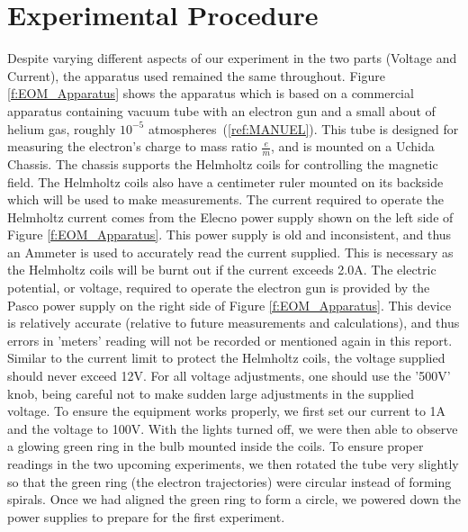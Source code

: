 \documentclass[12pt]{article}
\begin{document}
\section{Experimental Procedure}
Despite varying different aspects of our experiment in the two parts (Voltage and Current), the apparatus used remained the same throughout. Figure \ref{f:EOM_Apparatus} shows the apparatus which is based on a commercial apparatus containing vacuum tube with an electron gun and a small about of helium gas, roughly $10^{-5}$ atmospheres~(\ref{ref:MANUEL}). This tube is designed for measuring the electron's charge to mass ratio $\frac{e}{m}$, and is mounted on a Uchida Chassis. The chassis supports the Helmholtz coils for controlling the magnetic field. The Helmholtz coils also have a centimeter ruler mounted on its backside which will be used to make measurements. The current required to operate the Helmholtz current comes from the Elecno power supply shown on the left side of Figure \ref{f:EOM_Apparatus}. This power supply is old and inconsistent, and thus an Ammeter is used to accurately read the current supplied. This is necessary as the Helmholtz coils will be burnt out if the current exceeds 2.0A. The electric potential, or voltage, required to operate the electron gun is provided by the Pasco power supply on the right side of Figure \ref{f:EOM_Apparatus}. This device is relatively accurate (relative to future measurements and calculations), and thus errors in 'meters' reading will not be recorded or mentioned again in this report. Similar to the current limit to protect the Helmholtz coils, the voltage supplied should never exceed 12V. For all voltage adjustments, one should use the '500V' knob, being careful not to make sudden large adjustments in the supplied voltage. To ensure the equipment works properly, we first set our current to 1A and the voltage to 100V. With the lights turned off, we were then able to observe a glowing green ring in the bulb mounted inside the coils. To ensure proper readings in the two upcoming experiments, we then rotated the tube very slightly so that the green ring (the electron trajectories) were circular instead of forming spirals. Once we had aligned the green ring to form a circle, we powered down the power supplies to prepare for the first experiment.
\end{document}
